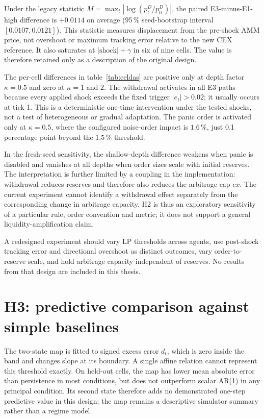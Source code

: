 Under the legacy statistic $M=\max_t|\log(p_t^D/p_0^D)|$, the paired E3-minus-E1-high difference is $+0.0114$ on average (95\,\% seed-bootstrap interval $[0.0107,0.0121]$). This statistic measures displacement from the pre-shock AMM price, not overshoot or maximum tracking error relative to the new CEX reference. It also saturates at $|\text{shock}|+\gamma$ in six of nine cells. The value is therefore retained only as a description of the original design.

The per-cell differences in table~\ref{tab:celdas} are positive only at depth factor $\kappa=0.5$ and zero at $\kappa=1$ and $2$. The withdrawal activates in all E3 paths because every applied shock exceeds the fixed trigger $|e_t|>0.02$; it usually occurs at tick 1. This is a deterministic one-time intervention under the tested shocks, not a test of heterogeneous or gradual adaptation. The panic order is activated only at $\kappa=0.5$, where the configured noise-order impact is $1.6\,\%$, just 0.1 percentage point beyond the $1.5\,\%$ threshold.

In the fresh-seed sensitivity, the shallow-depth difference weakens when panic is disabled and vanishes at all depths when order sizes scale with initial reserves. The interpretation is further limited by a coupling in the implementation: withdrawal reduces reserves and therefore also reduces the arbitrage cap $c x$. The current experiment cannot identify a withdrawal effect separately from the corresponding change in arbitrage capacity. H2 is thus an exploratory sensitivity of a particular rule, order convention and metric; it does not support a general liquidity-amplification claim.

A redesigned experiment should vary LP thresholds across agents, use post-shock tracking error and directional overshoot as distinct outcomes, vary order-to-reserve scale, and hold arbitrage capacity independent of reserves. No results from that design are included in this thesis.

\section{H3: predictive comparison against simple baselines}
\label{sec:res-h3}

The two-state map is fitted to signed excess error $d_t$, which is zero inside the band and changes slope at its boundary. A single affine relation cannot represent this threshold exactly. On held-out cells, the map has lower mean absolute error than persistence in most conditions, but does not outperform scalar AR(1) in any principal condition. Its second state therefore adds no demonstrated one-step predictive value in this design; the map remains a descriptive simulator summary rather than a regime model.

